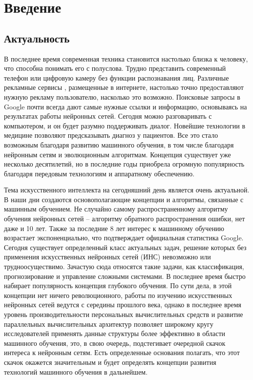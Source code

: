 \newpage

\chapter*{Введение}
\section*{Актуальность}

\indent\indent  В последнее время современная техника становится настолько
близка к человеку, что способна понимать его с полуслова.
Трудно представить современный телефон или цифровую камеру
 без функции распознавания лиц. Различные рекламные сервисы
, размещенные в интернете, настолько точно предоставляют
нужную рекламу пользователю, насколько это возможно.  
Поисковые запросы в Google почти всегда дают самые нужные
 ссылки и информацию, основываясь на результатах работы нейронных 
 сетей. Сегодня можно разговаривать с компьютером, и он будет 
 разумно поддерживать диалог. Новейшие технологии в медицине 
 позволяют предсказывать диагноз у пациентов. Все это стало 
 возможным благодаря развитию машинного обучения, в том числе
  благодаря нейронным сетям и эволюционным алгоритмам. 
  Концепция существует уже несколько десятилетий, но в 
  последние годы приобрела огромную популярность благодаря
 передовым технологиям и аппаратному обеспечению. 

Тема искусственного интеллекта на сегодняшний день является 
очень актуальной. В наши дни создаются основополагающие 
концепции и алгоритмы, связанные с машинным обучением. 
Не случайно самому распространенному алгоритму обучения 
нейронных сетей – алгоритму обратного распространения 
ошибки, нет даже и 10 лет. Также за последние 8 лет интерес 
к машинному обучению возрастает экспоненциально, 
что подтверждает официальная статистика Google. 
Сегодня существует определенный класс актуальных задач, 
решение которых без применения искусственных нейронных 
сетей (ИНС) невозможно или трудноосуществимо. Зачастую 
сюда относятся такие задачи, как классификация, 
прогнозирование и управление сложными системами. 
В последнее время быстро набирает популярность 
концепция глубокого обучения. По сути дела, в этой 
концепции нет ничего революционного, работы по изучению 
искусственных нейронных сетей ведутся с середины прошлого
 века, однако в последнее время уровень производительности 
 персональных вычислительных средств и развитие параллельных 
 вычислительных архитектур позволяет широкому кругу 
 исследователей применять данные структуры более эффективно 
 в области машинного обучения, это, в свою очередь, 
 подстегивает очередной скачок интереса к нейронным сетям. 
 Есть определенные основания полагать, что этот скачок окажется 
 значительным и будет определять концепции развития технологий 
 машинного обучения в дальнейшем.


